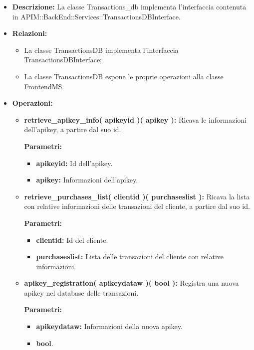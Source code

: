 \begin{itemize}
	\item \textbf{Descrizione:} La classe Transactions\_db implementa l'interfaccia contenuta in APIM::BackEnd::Services::TransactionsDBInterface.
	\item \textbf{Relazioni:}
		\begin{itemize}
			\item La classe TransactionsDB implementa l'interfaccia TransactionsDBInterface;
			\item La classe TransactionsDB espone le proprie operazioni alla classe FrontendMS.
		\end{itemize}
	\item \textbf{Operazioni:}
		\begin{itemize}
		
			\item \textbf{retrieve\_apikey\_info( apikeyid )( apikey ):} Ricava le informazioni dell'apikey, a partire dal suo id.
				\begin{description}
    				\item[\textbf{Parametri:}]
				\end{description}
				\begin{itemize}
					\item \textbf{apikeyid:} Id dell'apikey.
					\item \textbf{apikey:} Informazioni dell'apikey.
				\end{itemize}
				
			\item \textbf{retrieve\_purchases\_list( clientid )( purchaseslist ):} Ricava la lista con relative informazioni delle transazioni del cliente, a partire dal suo id.
				\begin{description}
    				\item[\textbf{Parametri:}]
				\end{description}
				\begin{itemize}
					\item \textbf{clientid:} Id del cliente.
					\item \textbf{purchaseslist:} Lista delle transazioni del cliente con relative informazioni.
				\end{itemize}
				
			\item \textbf{apikey\_registration( apikeydataw )( bool ):} Registra una nuova apikey nel database delle transazioni.
				\begin{description}
    				\item[\textbf{Parametri:}]
				\end{description}
				\begin{itemize}
					\item \textbf{apikeydataw:} Informazioni della nuova apikey.
					\item \textbf{bool}.
				\end{itemize}
				

\end{itemize}
\end{itemize}
